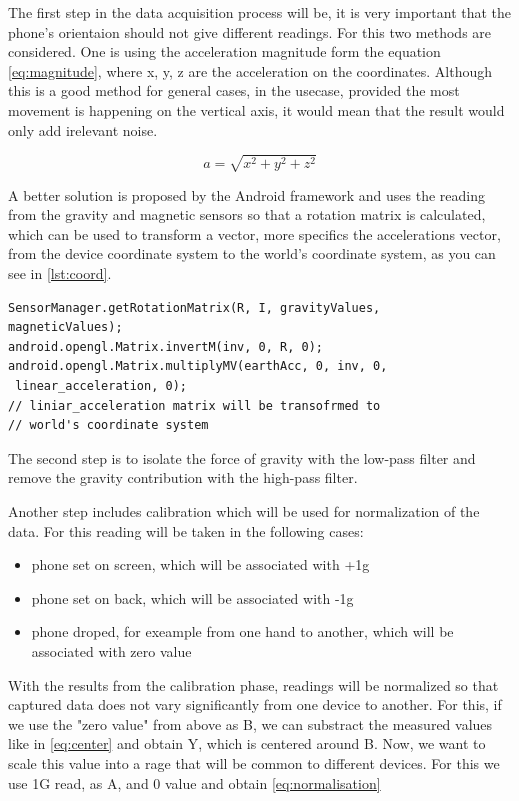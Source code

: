 The first step in the data acquisition process will be, it is very important that the phone's orientaion should not give different readings. For this two methods are considered. One is using the acceleration magnitude form the equation \ref{eq:magnitude}, where x, y, z are the acceleration on the coordinates. Although this is a good method for general cases, in the usecase, provided the most movement is happening on the vertical axis, it would mean that the result would only add irelevant noise.

\begin{equation}
a = \sqrt{x^{2} + y^{2} + z^{2}}
\label{eq:magnitude}
\end{equation}

A better solution is proposed by the Android framework and uses the reading from the gravity and magnetic sensors so that a rotation matrix is calculated, which can be used to transform a vector, more specifics the accelerations vector, from the device coordinate system to the world's coordinate system, as you can see in \ref{lst:coord}.

\lstset{language=make,caption=Transforming to world's coordinate system,label=lst:coord}
\begin{lstlisting}
SensorManager.getRotationMatrix(R, I, gravityValues,
magneticValues);
android.opengl.Matrix.invertM(inv, 0, R, 0);
android.opengl.Matrix.multiplyMV(earthAcc, 0, inv, 0,
 linear_acceleration, 0);
// liniar_acceleration matrix will be transofrmed to 
// world's coordinate system
\end{lstlisting}

The second step is to isolate the force of gravity with the low-pass filter and remove the gravity contribution with the high-pass filter.

Another step includes calibration which will be used for normalization of the data. For this reading will be taken in the following cases:
\begin{itemize}
\item phone set on screen, which will be associated with +1g
\item phone set on back, which will be associated with -1g
\item phone droped, for exeample from one hand to another, which will be associated with zero value
\end{itemize}

With the results from the calibration phase, readings will be normalized so that captured data does not vary significantly from one device to another. For this, if we use the "zero value" from above as B, we can substract the measured values like in \ref{eq:center} and obtain Y, which is centered around B. Now, we want to scale this value into a rage that will be common to different devices. For this we use 1G read, as A, and 0 value and obtain \ref{eq:normalisation}

